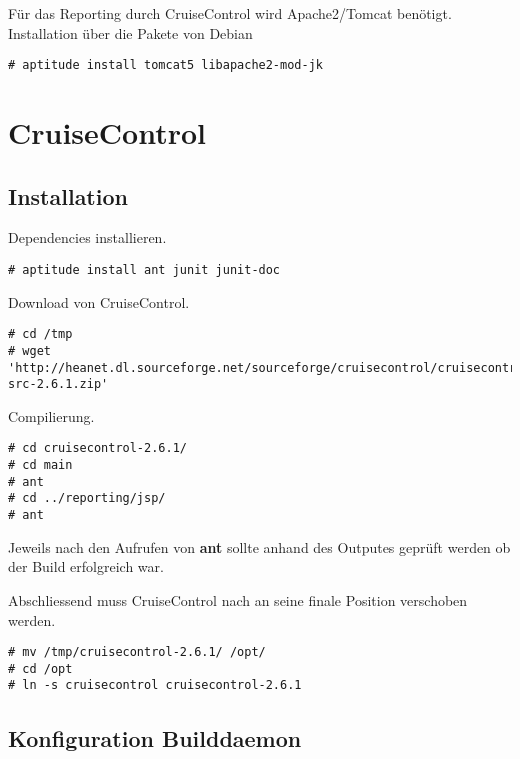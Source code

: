 \documentclass[a4paper,12pt,halfparskip,DIV14]{scrreprt}
\begin{document}
Für das Reporting durch CruiseControl wird Apache2/Tomcat benötigt. Installation über die Pakete von Debian

\begin{verbatim}
# aptitude install tomcat5 libapache2-mod-jk
\end{verbatim}


\section{CruiseControl} %
\label{sec:cruisecontrol}

\subsection{Installation} %
\label{sub:installation-cruisecontrol}

Dependencies installieren.

\begin{verbatim}
# aptitude install ant junit junit-doc
\end{verbatim}

Download von CruiseControl.

\begin{verbatim}
# cd /tmp
# wget 'http://heanet.dl.sourceforge.net/sourceforge/cruisecontrol/cruisecontrol-src-2.6.1.zip'
\end{verbatim}

Compilierung.

\begin{verbatim}
# cd cruisecontrol-2.6.1/
# cd main
# ant
# cd ../reporting/jsp/
# ant
\end{verbatim}

Jeweils nach den Aufrufen von \textbf{ant} sollte anhand des Outputes geprüft werden ob der Build erfolgreich war.

Abschliessend muss CruiseControl nach an seine finale Position verschoben werden.

\begin{verbatim}
# mv /tmp/cruisecontrol-2.6.1/ /opt/
# cd /opt
# ln -s cruisecontrol cruisecontrol-2.6.1
\end{verbatim}


\subsection{Konfiguration Builddaemon} %
\label{sub:konfiguration_builddaemon}
\end{document}
